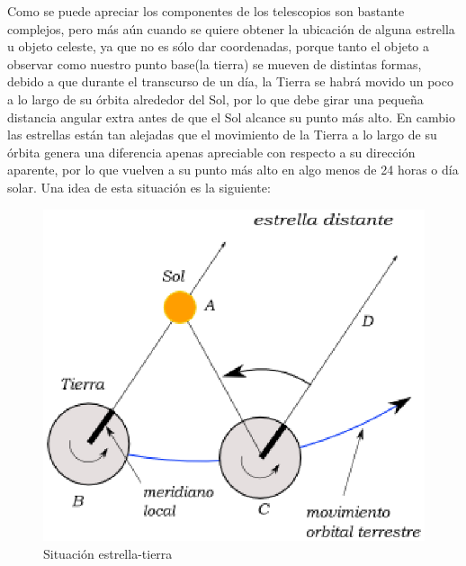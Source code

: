 \documentclass[letterpaper,titlepage,spanish,10pt]{article}
\begin{document}
Como se puede apreciar los componentes de los telescopios son bastante complejos, 
pero m\'as a\'un cuando se quiere obtener la ubicaci\'on de alguna estrella u objeto 
celeste, ya que no es s\'olo dar coordenadas, porque tanto el objeto a observar como 
nuestro punto base(la tierra) se mueven de distintas formas, debido a que durante el 
transcurso de un d\'ia, la Tierra se habr\'a movido un poco a lo largo de su \'orbita 
alrededor del Sol, por lo que debe girar una peque\~na distancia angular extra antes 
de que el Sol alcance su punto m\'as alto. En cambio las estrellas est\'an tan alejadas 
que el movimiento de la Tierra a lo largo de su \'orbita genera una diferencia apenas 
apreciable con respecto a su direcci\'on aparente, por lo que vuelven a su punto m\'as 
alto en algo menos de 24 horas o d\'ia solar. Una idea de esta situaci\'on es la siguiente:
\begin{figure}[h!]
 \centering
 \includegraphics[scale=0.7]{tmp.eps}
 \caption{Situaci\'on estrella-tierra}
\end{figure} 
\end{document}
